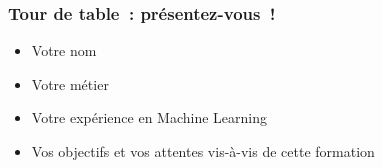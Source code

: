 \begin{frame}
  \frametitle{Tour de table~: présentez-vous~!}
  \begin{itemize}
    \item Votre nom
    \item Votre métier
    \item Votre expérience en Machine Learning
    \item Vos objectifs et vos attentes vis-à-vis de cette formation
  \end{itemize}
\end{frame}
